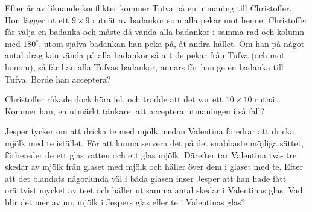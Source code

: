 \begin{problem}
	Efter år av liknande konflikter kommer Tufva på en utmaning till Christoffer. Hon lägger ut ett \(9 \times 9\) rutnät av badankor som alla pekar mot henne. Christoffer får välja en badanka och måste då vända alla badankor i samma rad och kolumn med \(180 ^\circ\), utom själva badankan han peka på, åt andra hållet. Om han på något antal drag kan vända på alla badankor så att de pekar från Tufva (och mot honom), så får han alla Tufvas badankor, annars får han ge en badanka till Tufva. Borde han acceptera?
\end{problem}

\begin{problem}
	Christoffer råkade dock höra fel, och trodde att det var ett \(10 \times 10\) rutnät. Kommer han, en utmärkt tänkare, att acceptera utmaningen i så fall?
\end{problem}

\setcounter{theorem}{0}
\setcounter{section}{\thesection+1} %

\begin{problem}
	Jesper tycker om att dricka te med mjölk medan Valentina föredrar att dricka mjölk med te istället. För att kunna servera det på det snabbaste möjliga sättet, förbereder de ett glas vatten och ett glas mjölk. Därefter tar Valentina två- tre skedar av mjölk från glaset med mjölk och häller över dem i glaset med te. Efter att det blandats någorlunda väl i båda glasen inser Jesper att han hade fått orättvist mycket av teet och häller ut samma antal skedar i Valentinas glas. Vad blir det mer av nu, mjölk i Jespers glas eller te i Valentinas glas? \end{problem}

